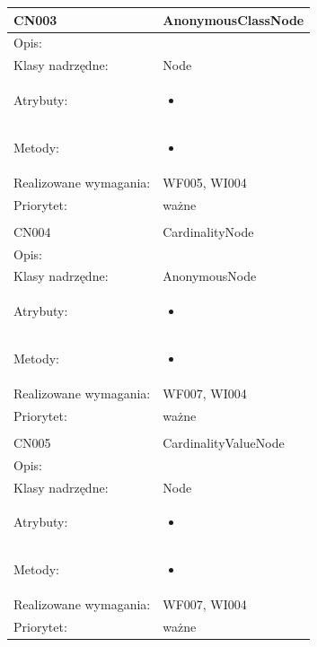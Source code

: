 \documentclass[a4paper,10pt]{article}
\begin{document}
\begin{center}
\begin{longtable}{|m{3cm}|m{9cm}|}
CN003 & AnonymousClassNode \\ \hline
Opis: &     \\ \hline
Klasy nadrzędne: & Node     \\ \hline
Atrybuty: & \begin{itemize}
 \item 
\end{itemize}
 \\ \hline
Metody: & \begin{itemize}
 \item 
\end{itemize}
  \\ \hline
Realizowane wymagania: & WF005, WI004 \\ \hline
Priorytet: & ważne \\ \hline

\multicolumn{2}{c}{} \\
 \hline

CN004 & CardinalityNode \\ \hline
Opis: &     \\ \hline
Klasy nadrzędne: & AnonymousNode     \\ \hline
Atrybuty: & \begin{itemize}
 \item 
\end{itemize}
 \\ \hline
Metody: & \begin{itemize}
 \item 
\end{itemize}
  \\ \hline
Realizowane wymagania: & WF007, WI004 \\ \hline
Priorytet: & ważne  \\ \hline

\multicolumn{2}{c}{} \\
 \hline

CN005 & CardinalityValueNode \\ \hline
Opis: &     \\ \hline
Klasy nadrzędne: & Node     \\ \hline
Atrybuty: & \begin{itemize}
 \item 
\end{itemize}
 \\ \hline
Metody: & \begin{itemize}
 \item 
\end{itemize}
  \\ \hline
Realizowane wymagania: & WF007, WI004 \\ \hline
Priorytet: & ważne  \\ \hline


\end{longtable}
\end{center}
\end{document}
